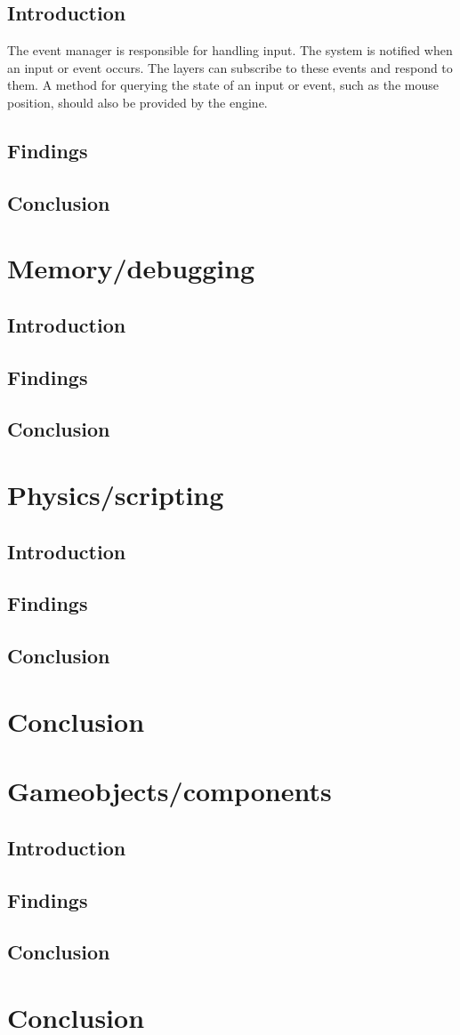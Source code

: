 \documentclass{projdoc}
\begin{document}
    \subsection{Introduction}
    The event manager is responsible for handling input. The system is notified when an input or event occurs.
    The layers can subscribe to these events and respond to them. A method for querying the state of an input or event, such as the mouse position, should also be provided by the engine.
    \subsection{Findings}
    \subsection{Conclusion}
\section{Memory/debugging}
    \subsection{Introduction}
    \subsection{Findings}
    \subsection{Conclusion}
\section{Physics/scripting}
    \subsection{Introduction}
    \subsection{Findings}
    \subsection{Conclusion}
\section{Conclusion}
\section{Gameobjects/components}
    \subsection{Introduction}
    \subsection{Findings}
    \subsection{Conclusion}
\section{Conclusion}
\end{document}

